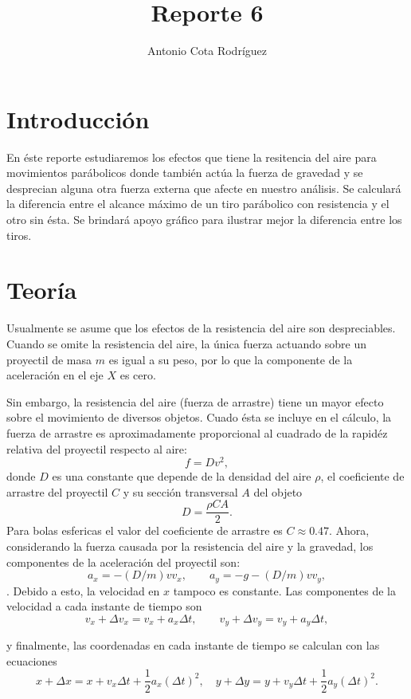 \documentclass[10pt,a4paper]{article}
\title{Reporte 6}
\author{Antonio Cota Rodr\'iguez}
\date{}
\begin{document}
\maketitle{}

\section*{Introducci\'on}
En \'este reporte estudiaremos los efectos que tiene la resitencia del aire para movimientos par\'abolicos donde tambi\'en act\'ua la fuerza de gravedad y se desprecian alguna otra fuerza externa que afecte en nuestro an\'alisis. Se calcular\'a la diferencia entre el alcance m\'aximo de un tiro par\'abolico con resistencia y el otro sin \'esta. Se brindar\'a apoyo gr\'afico para ilustrar mejor la diferencia entre los tiros.

\section*{Teor\'ia}

Usualmente se asume que los efectos de la resistencia del aire son despreciables. Cuando se omite la resistencia del aire, la \'unica fuerza actuando sobre un proyectil de masa $m$   es igual a su peso, por lo que la componente de la aceleraci\'on en el eje $X$ es cero.

Sin embargo, la resistencia del aire (fuerza de arrastre) tiene un mayor efecto sobre el movimiento de diversos objetos.  Cuado \'esta se incluye en el c\'alculo, la fuerza de arrastre es aproximadamente proporcional al cuadrado de la rapid\'ez relativa del proyectil respecto al aire:
$$f=Dv^2,$$
donde $D$ es una constante que depende de la densidad del aire $\rho$, el coeficiente de arrastre del proyectil $C$ y su secci\'on transversal $A$ del objeto
$$D=\frac{\rho C A}{2}.$$
Para bolas esfericas el valor del coeficiente de arrastre es $C \approx 0.47$. Ahora, considerando la fuerza causada por la resistencia del aire y la gravedad, los componentes de la aceleraci\'on del proyectil son:
$$a_x=-(D/m)vv_x, \qquad a_y=-g-(D/m)vv_y,$$.
Debido a esto, la velocidad en $x$ tampoco es constante. Las componentes de la velocidad a cada instante de tiempo son
$$v_x + \Delta v_x = v_x + a_x \Delta t, \qquad 
v_y + \Delta v_y = v_y + a_y \Delta t,$$

y finalmente, las coordenadas en cada instante de tiempo se calculan con las ecuaciones
$$x + \Delta x = x + v_x \Delta t + \frac{1}{2} a_x (\Delta t)^2, \quad y + \Delta y = y + v_y \Delta t + \frac{1}{2} a_y (\Delta t)^2.$$
\end{document}
